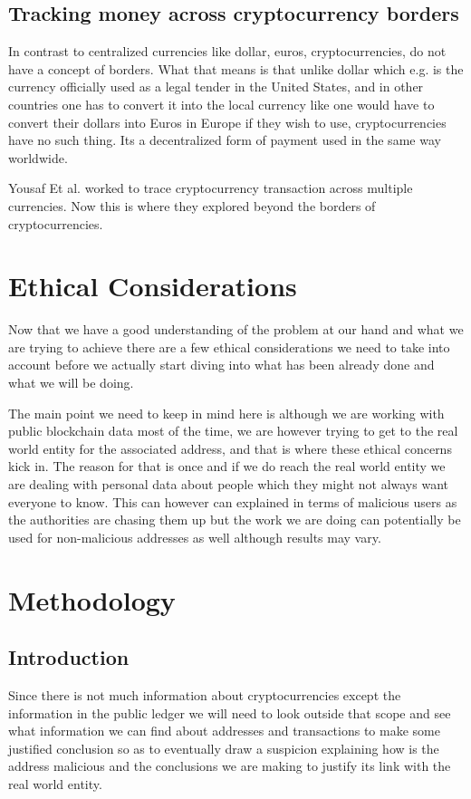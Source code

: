 \documentclass{article}
\begin{document}
\subsection{Tracking money across cryptocurrency borders}
In contrast to centralized currencies like dollar, euros, cryptocurrencies, do not have a concept of borders. What that means is that unlike dollar which e.g. is the currency officially used as a legal tender in the United States, and in other countries one has to convert it into the local currency like one would have to convert their dollars into Euros in Europe if they wish to use, cryptocurrencies have no such thing. Its a decentralized form of payment used in the same way worldwide. 

Yousaf Et al. \cite{tracing_transactions_across_cryptocurrency_ledgers_-_usenix} worked to trace cryptocurrency transaction across multiple currencies. Now this is where they explored beyond the borders of cryptocurrencies.


\pagebreak

\section{Ethical Considerations}

Now that we have a good understanding of the problem at our hand and what we are trying to achieve there are a few ethical considerations we need to take into account before we actually start diving into what has been already done and what we will be doing.

The main point we need to keep in mind here is although we are working with public blockchain data most of the time, we are however trying to get to the real world entity for the associated address, and that is where these ethical concerns kick in. The reason for that is once and if we do reach the real world entity we are dealing with personal data about people which they might not always want everyone to know. This can however can explained in terms of malicious users as the authorities are chasing them up but the work we are doing can potentially be used for non-malicious addresses as well although results may vary.

\pagebreak

\section{Methodology}
 \subsection{Introduction}
    Since there is not much information about cryptocurrencies except the information in the public ledger we will need to look outside that scope and see what information we can find about addresses and transactions to make some justified conclusion so as to eventually draw a suspicion explaining how is the address malicious and the conclusions we are making to justify its link with the real world entity. 
    
\end{document}
